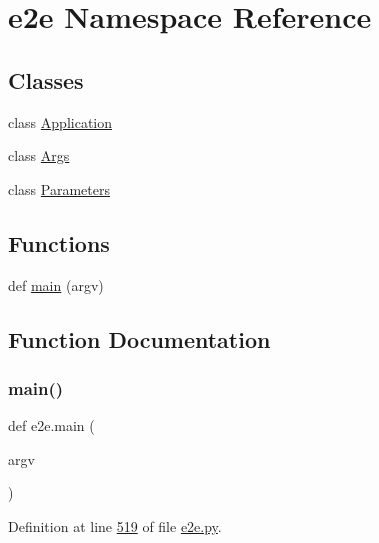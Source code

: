 \hypertarget{namespacee2e}{}\section{e2e Namespace Reference}
\label{namespacee2e}
\subsection*{Classes}
\begin{DoxyCompactItemize}
\item 
class \hyperlink{classe2e_1_1_application}{Application}
\item 
class \hyperlink{classe2e_1_1_args}{Args}
\item 
class \hyperlink{classe2e_1_1_parameters}{Parameters}
\end{DoxyCompactItemize}
\subsection*{Functions}
\begin{DoxyCompactItemize}
\item 
def \hyperlink{namespacee2e_afb3e7d384688a07b72e1df5201192375}{main} (argv)
\end{DoxyCompactItemize}


\subsection{Function Documentation}
\mbox{\label{namespacee2e_afb3e7d384688a07b72e1df5201192375}} 
\subsubsection{\texorpdfstring{main()}{main()}}
{\footnotesize\ttfamily def e2e.\+main (\begin{DoxyParamCaption}\item[{}]{argv }\end{DoxyParamCaption})}



Definition at line \hyperlink{e2e_8py_source_l00519}{519} of file \hyperlink{e2e_8py_source}{e2e.\+py}.


